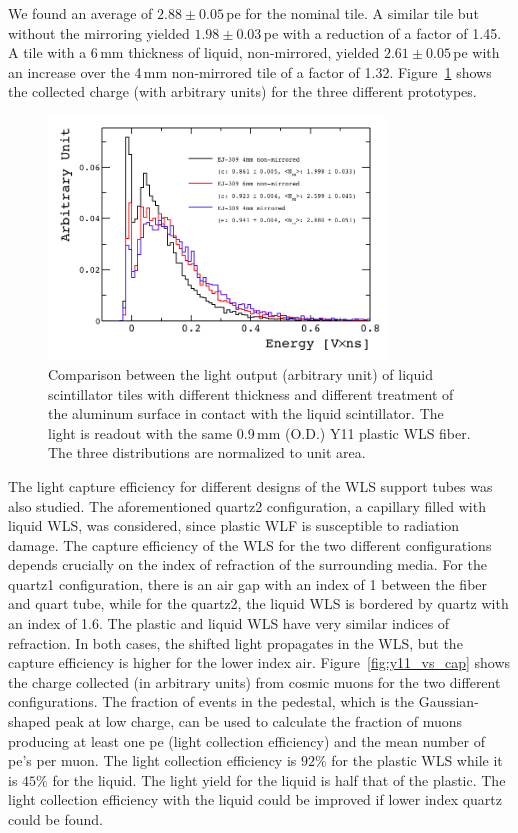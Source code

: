 \documentclass[review]{elsarticle}
\begin{document}
We found an average of 
$2.88\pm 0.05$\,pe for the nominal tile. A similar tile but without
the mirroring yielded $1.98\pm 0.03$\,pe with a reduction of a factor of
1.45. A tile with a 6\,mm thickness of liquid, non-mirrored, yielded
$2.61\pm 0.05$\,pe with an increase over the 4\,mm non-mirrored tile of a
factor of 1.32.
Figure~\ref{fig:thickness_comp} shows the collected charge (with arbitrary units)
for the three different prototypes.

\begin{figure}[!ht]
\begin{center}
\includegraphics[width=0.8\textwidth]{./figures/list_NEW_PROTOTYPES_all.png}
\caption{Comparison between the light output (arbitrary unit)
  of liquid scintillator
  tiles with different thickness and different treatment of the
  aluminum surface in contact with the liquid scintillator. The light
  is readout with the same 0.9\,mm (O.D.) Y11 plastic WLS fiber. The
  three distributions are normalized to unit area.}
\label{fig:thickness_comp}
\end{center}
\end{figure}


The light capture efficiency for different designs of the WLS support tubes was also studied.  The aforementioned quartz2 configuration, a capillary filled with liquid WLS, was considered, since plastic WLF is susceptible to radiation damage.
The capture efficiency of the WLS for the two different configurations
depends crucially on the index of refraction 
of the surrounding media.  
For the quartz1 configuration, there is an air gap with an index of 1 between the fiber and quart tube, while for the quartz2, the liquid WLS is bordered by quartz with an index of 1.6.
The plastic and liquid WLS have very similar
indices of refraction.  In both cases, the shifted light propagates
in the WLS, but the capture efficiency is higher for the lower index air.
Figure~\ref{fig:y11_vs_cap} shows the charge collected (in arbitrary units)
from cosmic muons for the two different configurations.  The fraction of
events in the pedestal, which is the Gaussian-shaped peak at low charge,
can be used to calculate the fraction of muons producing at least one pe
(light collection efficiency)
and the mean number of pe's per muon.
The light collection efficiency
is  $92\%$ for the plastic WLS while it is  $45\%$ for the liquid.  The light
yield for the liquid is half that of the plastic.
The light collection efficiency with the liquid could be improved
if lower index quartz
could be found.
\end{document}
